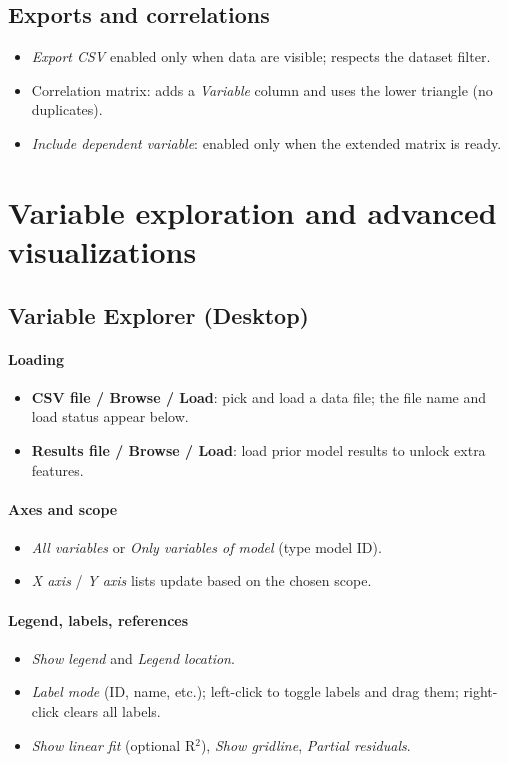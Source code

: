 \documentclass[12pt,a4paper]{article}
\begin{document}
\subsection{Exports and correlations}
\begin{itemize}
  \item \emph{Export CSV} enabled only when data are visible; respects the dataset filter.
  \item Correlation matrix: adds a \emph{Variable} column and uses the lower triangle (no duplicates).
  \item \emph{Include dependent variable}: enabled only when the extended matrix is ready.
\end{itemize}

\section{Variable exploration and advanced visualizations}
\subsection{Variable Explorer (Desktop)}
\paragraph{Loading}
\begin{itemize}
  \item \textbf{CSV file / Browse / Load}: pick and load a data file; the file name and load status appear below.
  \item \textbf{Results file / Browse / Load}: load prior model results to unlock extra features.
\end{itemize}

\paragraph{Axes and scope}
\begin{itemize}
  \item \emph{All variables} or \emph{Only variables of model} (type model ID).
  \item \emph{X axis} / \emph{Y axis} lists update based on the chosen scope.
\end{itemize}

\paragraph{Legend, labels, references}
\begin{itemize}
  \item \emph{Show legend} and \emph{Legend location}.
  \item \emph{Label mode} (ID, name, etc.); left-click to toggle labels and drag them; right-click clears all labels.
  \item \emph{Show linear fit} (optional R$^2$), \emph{Show gridline}, \emph{Partial residuals}.
\end{itemize}
\end{document}
